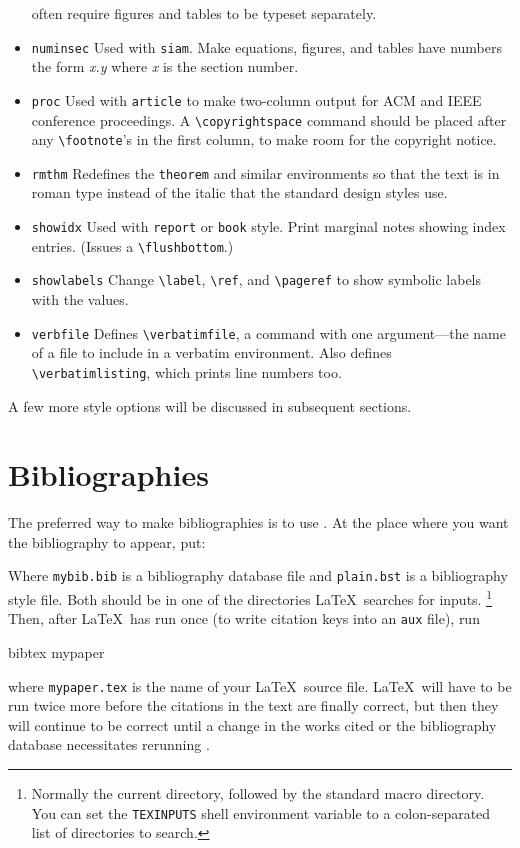 \begin{itemize}
often require figures and tables to be typeset separately.
\item[] \hbox{\tt numinsec}
Used with \verb|siam|.
Make equations, figures, and tables have numbers
the form {\it x.y} where {\it x} is the section number.
\item[] \hbox{\tt proc}
Used with \verb|article| to make two-column output for ACM and
IEEE conference proceedings.
A \verb|\copyrightspace| command should be placed after any \verb|\footnote|'s
in the first column, to make room for the copyright notice.
\item[] \hbox{\tt rmthm}
Redefines the {\tt theorem} and similar environments
so that the text is in roman type instead of the italic that the
standard design styles use.
\item[] \hbox{\tt showidx}
Used with \verb|report| or \verb|book| style.
Print marginal notes showing index entries.
(Issues a \verb|\flushbottom|.)
\item[] \hbox{\tt showlabels}
Change \verb|\label|, \verb|\ref|, and \verb|\pageref| to show
symbolic labels with the values.
\item[] \hbox{\tt verbfile}
Defines \verb|\verbatimfile|, a command with one argument---the name
of a file to include in a verbatim environment.
Also defines \verb|\verbatimlisting|, which prints line numbers too.
\end{itemize}

A few more style options will be discussed in subsequent sections.
 
\section{Bibliographies}

The preferred way to make bibliographies is to use \BibTeX.
At the place where you want the bibliography to appear, put:
\begin{eg}


\end{eg}
Where \verb|mybib.bib| is a bibliography database file and
\verb|plain.bst| is a bibliography style file.
Both should be in one of the directories \LaTeX\ searches for inputs.%
\footnote{Normally the current directory, followed by the standard
macro directory.  You can set the \verb|TEXINPUTS|
shell environment variable to a colon-separated list of directories
to search.}
Then, after \LaTeX\ has run once (to write citation keys into
an \verb|aux| file), run
\begin{eg}
bibtex mypaper
\end{eg}
where \verb|mypaper.tex| is the name of your \LaTeX\ source file.
\LaTeX\ will have to be run twice more before the citations in the
text are finally correct, but then they will continue to be correct
until a change in the works cited or the bibliography database
necessitates rerunning \BibTeX.

